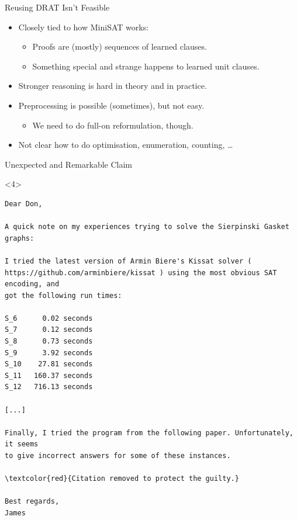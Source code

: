 \documentclass{beamer}
\begin{document}
\begin{frame}{Reusing DRAT Isn't Feasible}
    \begin{itemize}
        \item Closely tied to how MiniSAT works:
            \begin{itemize}
                \item Proofs are (mostly) sequences of learned clauses.
                \item Something special and strange happens to learned unit clauses.
            \end{itemize}
        \item Stronger reasoning is hard in theory and in practice.
        \item Preprocessing is possible (sometimes), but not easy.
            \begin{itemize}
                \item We need to do full-on reformulation, though.
            \end{itemize}
        \item Not clear how to do optimisation, enumeration, counting, \ldots
    \end{itemize}
\end{frame}

\begin{frame}[fragile]{Unexpected and Remarkable Claim}
    \begin{onlyenv}<4>
\tiny\begin{Verbatim}[commandchars=\\\{\},codes={\catcode`$=3\catcode`^=7}]
Dear Don,

A quick note on my experiences trying to solve the Sierpinski Gasket graphs:

I tried the latest version of Armin Biere's Kissat solver (
https://github.com/arminbiere/kissat ) using the most obvious SAT encoding, and
got the following run times:

S_6      0.02 seconds
S_7      0.12 seconds
S_8      0.73 seconds
S_9      3.92 seconds
S_10    27.81 seconds
S_11   160.37 seconds
S_12   716.13 seconds

[...]

Finally, I tried the program from the following paper. Unfortunately, it seems
to give incorrect answers for some of these instances.

\textcolor{red}{Citation removed to protect the guilty.}

Best regards,
James
\end{Verbatim}
    \end{onlyenv}
\end{frame}
\end{document}

